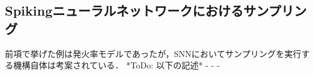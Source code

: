 \subsection{Spikingニューラルネットワークにおけるサンプリング}前項で挙げた例は発火率モデルであったが，SNNにおいてサンプリングを実行する機構自体は考案されている．
*ToDo: 以下の記述*
- \cite{Buesing2011-dm}
- \cite{Masset2022-wh}
- \cite{Zhang2022-bl}